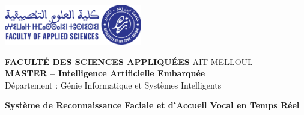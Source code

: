 \documentclass[12pt,a4paper]{article}
\begin{document}
\begin{titlepage}
    \centering
    
    \begin{tcolorbox}[colback=lightgray, colframe=primaryblue, width=0.9\textwidth, arc=5mm, boxrule=2pt]
        \centering
        \vspace{0.5cm}
        
        \begin{center}
           \includegraphics[width=6cm]{FSA_logo.png}
        \end{center}
        
        \vspace{0.5cm}
        
        {\Large\bfseries\color{primaryblue} FACULTÉ DES SCIENCES APPLIQUÉES} {\large\color{primaryblue} AIT MELLOUL} \vspace{0.5cm} \\{\large\bfseries\color{secondaryblue} MASTER – Intelligence Artificielle Embarquée}\\
        {\normalsize\color{darkgray} Département : Génie Informatique et Systèmes Intelligents}
        
        \vspace{0.5cm}
    \end{tcolorbox}
    
    \vspace{2cm}
    
    \begin{tcolorbox}[colback=primaryblue!10, colframe=primaryblue, width=0.9\textwidth, arc=3mm]
        \centering
        {\Huge\bfseries\color{primaryblue} Système de Reconnaissance Faciale et d'Accueil Vocal en Temps Réel}
    \end{tcolorbox}
    
    \vspace{2cm}
    

\end{titlepage}
\end{document}
